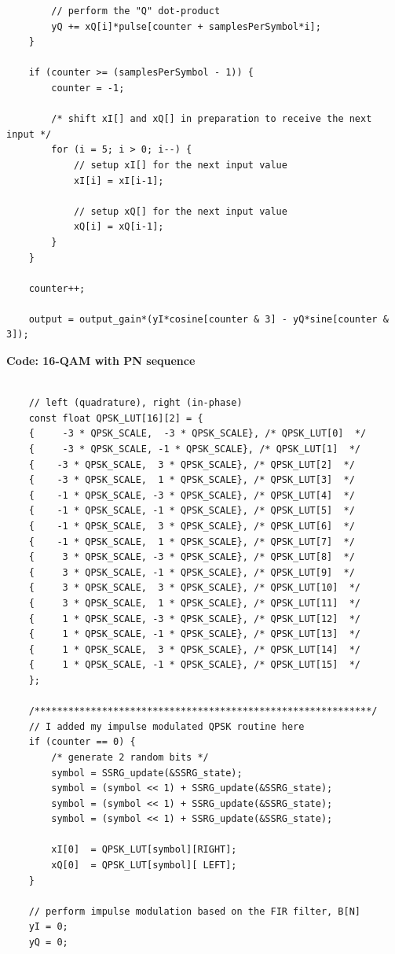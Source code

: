 \documentclass{article}
\begin{document}
\begin{verbatim}
		// perform the "Q" dot-product
		yQ += xQ[i]*pulse[counter + samplesPerSymbol*i];	
	}

	if (counter >= (samplesPerSymbol - 1)) {
		counter = -1; 

		/* shift xI[] and xQ[] in preparation to receive the next input */
		for (i = 5; i > 0; i--) {
			// setup xI[] for the next input value
			xI[i] = xI[i-1];  

			// setup xQ[] for the next input value
			xQ[i] = xQ[i-1];  
		}
	}

	counter++;

	output = output_gain*(yI*cosine[counter & 3] - yQ*sine[counter & 3]);
\end{verbatim}


\textbf{Code: 16-QAM with PN sequence}

\begin{verbatim}

	// left (quadrature), right (in-phase)
	const float QPSK_LUT[16][2] = {
	{     -3 * QPSK_SCALE,  -3 * QPSK_SCALE}, /* QPSK_LUT[0]  */
	{     -3 * QPSK_SCALE, -1 * QPSK_SCALE}, /* QPSK_LUT[1]  */
	{    -3 * QPSK_SCALE,  3 * QPSK_SCALE}, /* QPSK_LUT[2]  */
	{    -3 * QPSK_SCALE,  1 * QPSK_SCALE}, /* QPSK_LUT[3]  */
	{    -1 * QPSK_SCALE, -3 * QPSK_SCALE}, /* QPSK_LUT[4]  */
	{    -1 * QPSK_SCALE, -1 * QPSK_SCALE}, /* QPSK_LUT[5]  */
	{    -1 * QPSK_SCALE,  3 * QPSK_SCALE}, /* QPSK_LUT[6]  */
	{    -1 * QPSK_SCALE,  1 * QPSK_SCALE}, /* QPSK_LUT[7]  */
	{     3 * QPSK_SCALE, -3 * QPSK_SCALE}, /* QPSK_LUT[8]  */
	{     3 * QPSK_SCALE, -1 * QPSK_SCALE}, /* QPSK_LUT[9]  */
	{     3 * QPSK_SCALE,  3 * QPSK_SCALE}, /* QPSK_LUT[10]  */
	{     3 * QPSK_SCALE,  1 * QPSK_SCALE}, /* QPSK_LUT[11]  */
	{     1 * QPSK_SCALE, -3 * QPSK_SCALE}, /* QPSK_LUT[12]  */
	{     1 * QPSK_SCALE, -1 * QPSK_SCALE}, /* QPSK_LUT[13]  */
	{     1 * QPSK_SCALE,  3 * QPSK_SCALE}, /* QPSK_LUT[14]  */
	{     1 * QPSK_SCALE, -1 * QPSK_SCALE}, /* QPSK_LUT[15]  */
	};

	/************************************************************/
	// I added my impulse modulated QPSK routine here
	if (counter == 0) {
		/* generate 2 random bits */
		symbol = SSRG_update(&SSRG_state); 
		symbol = (symbol << 1) + SSRG_update(&SSRG_state);
		symbol = (symbol << 1) + SSRG_update(&SSRG_state);
		symbol = (symbol << 1) + SSRG_update(&SSRG_state);

		xI[0]  = QPSK_LUT[symbol][RIGHT];  
		xQ[0]  = QPSK_LUT[symbol][ LEFT];   
	}

	// perform impulse modulation based on the FIR filter, B[N]
	yI = 0;
	yQ = 0;


\end{verbatim}
\end{document}
